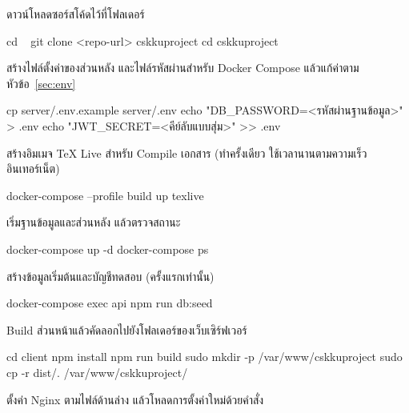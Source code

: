 \begin{steps}
  \item ดาวน์โหลดซอร์สโค้ดไว้ที่โฟลเดอร์ 
\begin{terminal}
cd ~
git clone <repo-url> cskkuproject
cd cskkuproject
\end{terminal}
  \item สร้างไฟล์ตั้งค่าของส่วนหลัง และไฟล์รหัสผ่านสำหรับ Docker Compose
        แล้วแก้ค่าตามหัวข้อ~\ref{sec:env}
\begin{terminal}
cp server/.env.example server/.env
echo "DB_PASSWORD=<รหัสผ่านฐานข้อมูล>" > .env
echo "JWT_SECRET=<คีย์ลับแบบสุ่ม>" >> .env
\end{terminal}
  \item สร้างอิมเมจ TeX Live สำหรับ Compile เอกสาร (ทำครั้งเดียว ใช้เวลานานตามความเร็วอินเทอร์เน็ต)
\begin{terminal}
docker-compose --profile build up texlive
\end{terminal}
  \item เริ่มฐานข้อมูลและส่วนหลัง แล้วตรวจสถานะ
\begin{terminal}
docker-compose up -d
docker-compose ps
\end{terminal}
  \item สร้างข้อมูลเริ่มต้นและบัญชีทดสอบ (ครั้งแรกเท่านั้น)
\begin{terminal}
docker-compose exec api npm run db:seed
\end{terminal}
  \item Build ส่วนหน้าแล้วคัดลอกไปยังโฟลเดอร์ของเว็บเซิร์ฟเวอร์
\begin{terminal}
cd client
npm install
npm run build
sudo mkdir -p /var/www/cskkuproject
sudo cp -r dist/. /var/www/cskkuproject/
\end{terminal}
  \item ตั้งค่า Nginx ตามไฟล์ด้านล่าง แล้วโหลดการตั้งค่าใหม่ด้วยคำสั่ง 
\end{steps}


